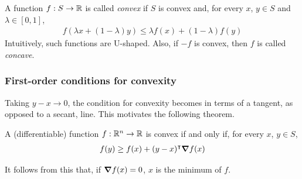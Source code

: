 \documentclass{../../template/note}
\begin{document}
    \begin{definition}
        A function $f: S \to \mathbb R$ is called \emph{convex} if $S$ is convex and, for every $x$, $y \in S$ and $\lambda \in [0, 1]$,
        \begin{align*}
            f(\lambda x + (1-\lambda)y) \leq \lambda f(x) + (1-\lambda)f(y)
        \end{align*}
        Intuitively, such functions are U-shaped. Also, if $-f$ is convex, then $f$ is called \emph{concave}.
    \end{definition}
    
    \subsubsection{First-order conditions for convexity}

    Taking $y-x \to 0$, the condition for convexity becomes in terms of a tangent, as opposed to a secant, line. This motivates the following theorem.

    \begin{theorem}
        A (differentiable) function $f: \mathbb R^n \to \mathbb R$ is convex if and only if, for every $x$, $y \in S$,
        \begin{align*}
            f(y) \geq f(x) + (y-x)^\intercal \grad f(x)
        \end{align*}
    \end{theorem}

    \begin{remark*}
        It follows from this that, if $\grad f(x) = 0$, $x$ is the minimum of $f$.
    \end{remark*}
    
\end{document}
